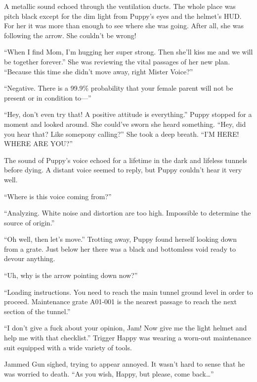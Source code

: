 \horizonline


A metallic sound echoed through the ventilation ducts. The whole place was pitch black except for the dim light from Puppy's eyes and the helmet's HUD. For her it was more than enough to see where she was going. After all, she was following the arrow. She couldn't be wrong!

``When I find Mom, I'm hugging her super strong. Then she'll kiss me and we will be together forever.'' She was reviewing the vital passages of her new plan. ``Because this time she didn't move away, right Mister Voice?''

{\mten ``Negative. There is a 99.9\% probability that your female parent will not be present or in condition to---''}

``Hey, don't even try that! A positive attitude is everything.'' Puppy stopped for a moment and looked around. She could've sworn she heard something. ``Hey, did you hear that? Like somepony calling?'' She took a deep breath. ``I'M HERE! WHERE ARE YOU?''

The sound of Puppy's voice echoed for a lifetime in the dark and lifeless tunnels before dying. A distant voice seemed to reply, but Puppy couldn't hear it very well.

``Where is this voice coming from?''

{\mten ``Analyzing. White noise and distortion are too high. Impossible to determine the source of origin.''}

``Oh well, then let's move.'' Trotting away, Puppy found herself looking down from a grate. Just below her there was a black and bottomless void ready to devour anything.

``Uh, why is the arrow pointing down now?''

{\mten ``Loading instructions. You need to reach the main tunnel ground level in order to proceed. Maintenance grate A01-001 is the nearest passage to reach the next section of the tunnel.''}


\horizonline


``I don't give a fuck about your opinion, Jam! Now give me the light helmet and help me with that checklist.'' Trigger Happy was wearing a worn-out maintenance suit equipped with a wide variety of tools.

Jammed Gun sighed, trying to appear annoyed. It wasn't hard to sense that he was worried to death. ``As you wish, Happy, but please, come back\dots''

